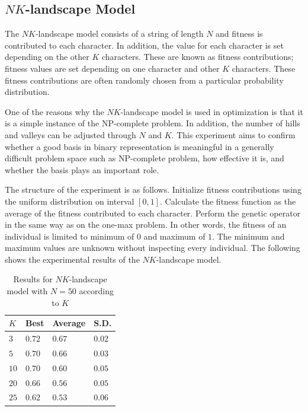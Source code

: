 \subsection{$ NK $-landscape Model}
The $NK$-landscape model consists of a string of length $N$ and fitness is contributed to each character.
In addition, the value for each character is set depending on the other $K$ characters.
These are known as fitness contributions; fitness values are set depending on one character and other $K$ characters.
These fitness contributions are often randomly chosen from a particular probability distribution.

One of the reasons why the $NK$-landscape model is used in optimization is that it is a simple instance of the NP-complete problem.
In addition, the number of hills and valleys can be adjusted through $N$ and $K$.
This experiment aims to confirm whether a good basis in binary representation is meaningful in a generally difficult problem space such as NP-complete problem,
how effective it is, and whether the basis plays an important role.

The structure of the experiment is as follows.
Initialize fitness contributions using the uniform distribution on interval $[0,1]$.
Calculate the fitness function as the average of the fitness contributed to each character.
Perform the genetic operator in the same way as on the one-max problem.
In other words, the fitness of an individual is limited to minimum of 0 and maximum of $1$.
The minimum and maximum values are unknown without inspecting every individual.
The following shows the experimental results of the $NK$-landscape model.


\begin{table}[H]
  \caption{Results for $ NK $-landscape model with $ N = 50 $ according to $ K $}
  \label{tab:results_nk_50}
  \begin{tabularx}{0.45\textwidth}{YYYY}
    \toprule
    $ K $    & Best & Average     &  S.D. \\
    \midrule
    $ 3  $  &  $ 0.72 $  &  $ 0.67 $  &  $ 0.02 $ \\
    $ 5  $  &  $ 0.70 $  &  $ 0.66 $  &  $ 0.03 $ \\
    $ 10 $  &  $ 0.70 $  &  $ 0.60 $  &  $ 0.05 $ \\
    $ 20 $  &  $ 0.66 $  &  $ 0.56 $  &  $ 0.05 $ \\
    $ 25 $  &  $ 0.62 $  &  $ 0.53 $  &  $ 0.06 $ \\
  \bottomrule
  \end{tabularx}
\end{table}

